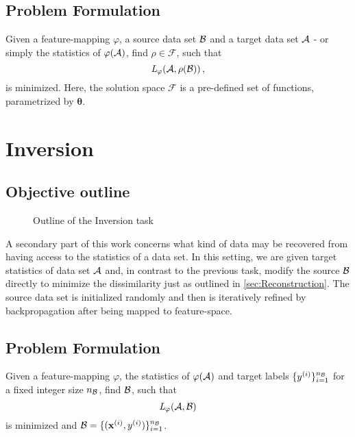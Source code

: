 \subsection{Problem Formulation}
Given a feature-mapping $\varphi$, a source data set $\mathcal B$ and a target data set $\mathcal A$ - or simply the statistics of $\varphi(\mathcal A)$,  find $\rho \in \mathcal{F}$, such that
\[
     \textit{L} _\varphi (\mathcal A, \rho(\mathcal B)) \,,
\]
is minimized.
Here, the solution space $\mathcal F$ is a pre-defined set of functions, 
parametrized by $\boldsymbol \theta$.






\section{Inversion}
\label{sec:Inversion}

\subsection{Objective outline}

\begin{figure}[h]
    \centering
    
    \caption{Outline of the Inversion task}
    \label{fig:inversion_outline}
    \centering
\end{figure}

A secondary part of this work concerns what kind of data 
may be recovered from having access to the statistics of a data set.
In this setting, we are given target statistics of data set $\mathcal A$
and, in contrast to the previous task, modify the source $\mathcal B$ directly to 
minimize the dissimilarity just as outlined in \cref{sec:Reconstruction}.
The source data set is initialized randomly and then is 
iteratively refined by backpropagation after being mapped to feature-space.



\subsection{Problem Formulation}
Given a feature-mapping $\varphi$, the statistics of $\varphi(\mathcal A)$
and target labels $\{y^{(i)}\}_{i=1}^{n_{\mathcal B}}$ for a fixed integer size $n_{\mathcal B}$,
find $\mathcal B$, such that
\[
     \textit{L} _\varphi (\mathcal A, \mathcal B)
\]
is minimized and $\mathcal B = \{(\mathbf x^{(i)}, y^{(i)})\}_{i=1}^{n_{\mathcal B}}$.

